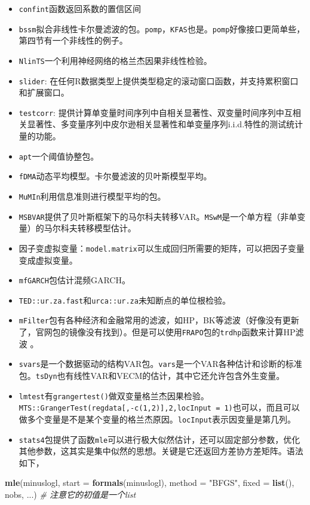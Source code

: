 \documentclass[
]{book}
\newenvironment{Shaded}{\begin{snugshade}}{\end{snugshade}}
\newcommand{\CommentTok}[1]{\textcolor[rgb]{0.56,0.35,0.01}{\textit{#1}}}
\newcommand{\DataTypeTok}[1]{\textcolor[rgb]{0.13,0.29,0.53}{#1}}
\newcommand{\KeywordTok}[1]{\textcolor[rgb]{0.13,0.29,0.53}{\textbf{#1}}}
\newcommand{\NormalTok}[1]{#1}
\newcommand{\StringTok}[1]{\textcolor[rgb]{0.31,0.60,0.02}{#1}}
\providecommand{\tightlist}{%
  \setlength{\itemsep}{0pt}\setlength{\parskip}{0pt}}
\begin{document}
\begin{itemize}
\tightlist
\item
  \texttt{confint}函数返回系数的置信区间
\item
  \texttt{bssm}拟合非线性卡尔曼滤波的包。\texttt{pomp}，\texttt{KFAS}也是。\texttt{pomp}好像接口更简单些，第四节有一个非线性的例子。
\item
  \texttt{NlinTS}一个利用神经网络的格兰杰因果非线性检验。
\item
  \texttt{slider}: 在任何R数据类型上提供类型稳定的滚动窗口函数，并支持累积窗口和扩展窗口。
\item
  \texttt{testcorr}: 提供计算单变量时间序列中自相关显著性、双变量时间序列中互相关显著性、多变量序列中皮尔逊相关显著性和单变量序列i.i.d.特性的测试统计量的功能。\\
\item
  \texttt{apt}一个阈值协整包。
\item
  \texttt{fDMA}动态平均模型。卡尔曼滤波的贝叶斯模型平均。
\item
  \texttt{MuMIn}利用信息准则进行模型平均的包。
\item
  \texttt{MSBVAR}提供了贝叶斯框架下的马尔科夫转移VAR。\texttt{MSwM}是一个单方程（非单变量）的马尔科夫转移模型估计。
\item
  因子变虚拟变量：\texttt{model.matrix}可以生成回归所需要的矩阵，可以把因子变量变成虚拟变量。
\item
  \texttt{mfGARCH}包估计混频GARCH。
\item
  \texttt{TED::ur.za.fast}和\texttt{urca::ur.za}未知断点的单位根检验。
\item
  \texttt{mFilter}包有各种经济和金融常用的滤波，如HP，BK等滤波（好像没有更新了，官网包的镜像没有找到）。但是可以使用\texttt{FRAPO}包的\texttt{trdhp}函数来计算HP滤波 。
\item
  \texttt{svars}是一个数据驱动的结构VAR包。\texttt{vars}是一个VAR各种估计和诊断的标准包。\texttt{tsDyn}也有线性VAR和VECM的估计，其中它还允许包含外生变量。
\item
  \texttt{lmtest}有\texttt{grangertest()}做双变量格兰杰因果检验。\texttt{MTS::GrangerTest(regdata{[},-c(1,2){]},2,locInput\ =\ 1)}也可以，而且可以做多个变量是不是某个变量的格兰杰原因。\texttt{locInput}表示因变量是第几列。
\item
  \texttt{stats4}包提供了函数\texttt{mle}可以进行极大似然估计，还可以固定部分参数，优化其他参数，这其实是集中似然的思想。关键是它还返回方差协方差矩阵。语法如下，
\end{itemize}

\begin{Shaded}
\begin{Highlighting}[]
\KeywordTok{mle}\NormalTok{(minuslogl, }\DataTypeTok{start =} \KeywordTok{formals}\NormalTok{(minuslogl), }\DataTypeTok{method =} \StringTok{"BFGS"}\NormalTok{,}
    \DataTypeTok{fixed =} \KeywordTok{list}\NormalTok{(), nobs, ...) }\CommentTok{# 注意它的初值是一个list}
\end{Highlighting}
\end{Shaded}
\end{document}
